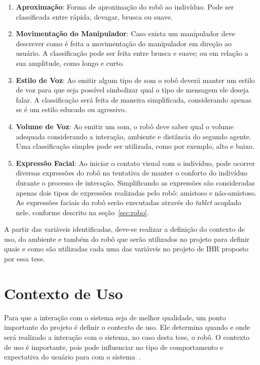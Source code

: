 \begin{enumerate}
	\item \textbf{Aproximação}: Forma de aproximação do robô ao indivíduo. Pode ser classificada entre rápida, devagar, brusca ou suave.
	\item \textbf{Movimentação do Manipulador}: Caso exista um manipulador deve descrever como é feita a movimentação do manipulador em direção ao usuário. A classificação pode ser feita entre brusca e suave; ou em relação a sua amplitude, como longo e curto.
	\item \textbf{Estilo de Voz}: Ao emitir algum tipo de som o robô deverá manter um estilo de voz para que seja possível simbolizar qual o tipo de mensagem ele deseja falar. A classificação será feita de maneira simplificada, considerando apenas se é um estilo educado ou agressivo.
	\item \textbf{Volume de Voz}: Ao emitir um som, o robô deve saber qual o volume adequada considerando a interação, ambiente e distância do segundo agente. Uma classificação simples pode ser utilizada, como por exemplo, alto e baixo.
	\item \textbf{Expressão Facial}: Ao iniciar o contato visual com o indivíduo, pode ocorrer diversas expressões do robô na tentativa de manter o conforto do indivíduo durante o processo de interação. Simplificando as expressões são consideradas apenas dois tipos de expressões realizadas pelo robô: amistoso e não-amistoso. As expressões faciais do robô serão executadas através do \emph{tablet} acoplado nele, conforme descrito na seção~\ref{sec:robo}.
\end{enumerate}

A partir das variáveis identificadas, deve-se realizar a definição do contexto de uso, do ambiente e também do robô que serão utilizados no projeto para definir quais e como são utilizadas cada uma das variáveis no projeto de IHR proposto por essa tese.

\section{Contexto de Uso}
\label{sec:contextouso}
Para que a interação com o sistema seja de melhor qualidade, um ponto importante do projeto é definir o contexto de uso. Ele determina quando e onde será realizado a interação com o sistema, no caso desta tese, o robô. O contexto de uso é importante, pois pode influenciar no tipo de comportamento e expectativa do usuário para com o sistema~\cite{barbosa:2010}.

